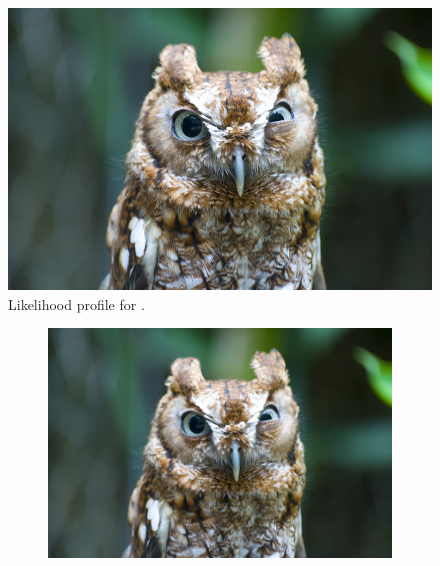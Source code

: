 {\begin{figure}[htbp]
    \centering
        \includegraphics[width= 0.6 \textwidth]{./Figs/placeholder.jpeg}  
    \caption{Likelihood profile for \Gmumu.}
    \label{fig:gammalike}
\end{figure}

\begin{figure}[htbp]
    \centering
  \begin{subfigure}[b]{0.6\textwidth}
        \includegraphics[width= \textwidth]{./Figs/placeholder.jpeg}
    \end{subfigure}



\end{figure}}
